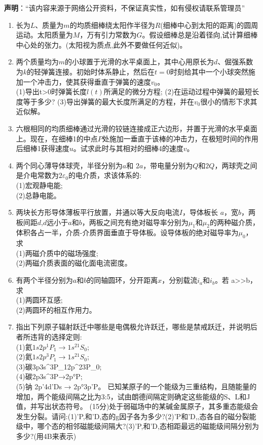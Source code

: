 

\textbf{声明}：“该内容来源于网络公开资料，不保证真实性，如有侵权请联系管理员”

\begin{enumerate}
\item 长为$L$、质量为$m$的均质细棒绕太阳作半径为$R$(细棒中心到太阳的距离)的圆周运动。太阳质量为$M$，万有引力常数为$G$。假设细棒总是沿着径向,试计算细棒中心处的张力。(太阳视为质点,此外不要做任何近似)。
\item 两个质量均为$m$的小球置于光滑的水平桌面上，其中心用原长为$d$、倔强系数为$k$的轻弹簧连接。初始时体系静止，然后在$t=0$时刻给其中一个小球突然施加一个冲击力，使其获得垂直于弹簧的速度$v_0$。\\
(1)导出t>0时弹簧长度$l(t)$所满足的微分方程;
(2)在运动过程中弹簧的最短长度等于多少?
(3)导出弹簧的最大长度所满足的方程，并在$v_0$很小的情形下求其近似解。
\item 六根相同的均质细棒通过光滑的铰链连接成正六边形，并置于光滑的水平桌面上。现在，在细棒1的中点$P$处施加一垂直于该棒的冲击力，在极短时间的作用后细棒1获得速度$u$。试求此时与其相对的细棒4的速度$v$。
\item 两个同心薄导体球壳，半径分别为$a$和 $2a$，带电量分别为$Q$和$2Q$，两球壳之间是介电常数为$2\varepsilon_0$的电介质，求该体系的:\\
(1)宏观静电能;\\
(2)总静电能。
\item 两块长方形导体薄板平行放置，并通以等大反向电流$I$，导体板长 $a$，宽$b$，两板间距$d$,$d$远小于$a$和$b$，两板之间充有绝对磁导率分别为$\mu_1$和$\mu_2$的两种磁介质，体积各占一半，介质-介质界面垂直于导体板。设导体板的绝对磁导率为$\mu_0$，求\\
(1)两磁介质中的磁场强度;\\
(2)两磁介质表面的磁化面电流密度。\\
\item 有两个半径分别为$a$和$b$的同轴圆环，分开距离$x$，分别载流$i_a$和$i_b$。若 a>>b，求\\
(1)两圆环互感;\\
(2)两圆环的相互作用力。
\item 指出下列原子辐射跃迁中哪些是电偶极允许跃迁，哪些是禁戒跃迁，并说明后者所违背的选择定则:\\
(1)氦$1s2p^1P_1 \to 1s^{21}S_0$;\\
(2)氦$1s2p^3P_1 \to 1s^{21}S_0$;\\
(3)碳3p3s^3P_1\to 2p^{23}P_0;\\
(4)碳2p3s^3P→2p°P;\\
(5)钠 2p'4d’Ds → 2p°3p’P。
已知某原子的一个能级为三重结构，且随能量的增加，两个能级间隔之比为3:5，试由朗德间隔定则确定这些能级的S、L和J值，并写出状态符号。
(15分)处于弱磁场中的某碱金属原子，其多重态能级会发生分裂。请问:(1)'P,和'D,态的g因子各为多少?(2)'P和'D,,态各自的磁分裂能级中，哪个态的相邻磁能级间隔大?(3)’P,和'D,态相距最远的磁能级间隔分别为多少?(用4B来表示)

\end{enumerate}